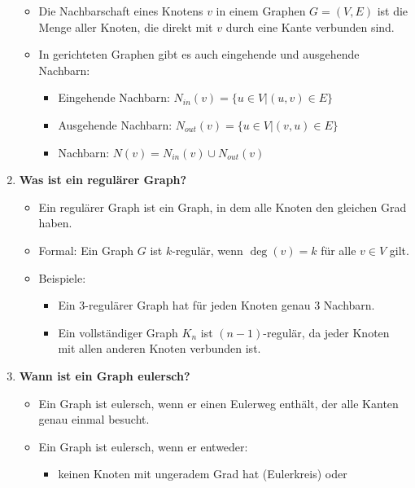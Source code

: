 \documentclass[12pt]{scrartcl}
\begin{document}
\begin{enumerate}
          \begin{itemize}
              \item Die Nachbarschaft eines Knotens $v$ in einem Graphen $G = (V, E)$ ist die Menge aller Knoten, die direkt mit $v$ durch eine Kante verbunden sind.
              \item In gerichteten Graphen gibt es auch eingehende und ausgehende Nachbarn:
                    \begin{itemize}
                        \item Eingehende Nachbarn: $N_{in}(v) = \{u \in V | (u, v) \in E\}$
                        \item Ausgehende Nachbarn: $N_{out}(v) = \{u \in V | (v, u) \in E\}$
                        \item Nachbarn: $N(v) = N_{in}(v) \cup N_{out}(v)$
                    \end{itemize}
          \end{itemize}
    \item \textbf{Was ist ein regulärer Graph?}
          \begin{itemize}
              \item Ein regulärer Graph ist ein Graph, in dem alle Knoten den gleichen Grad haben.
              \item Formal: Ein Graph $G$ ist $k$-regulär, wenn $\deg(v) = k$ für alle $v \in V$ gilt.
              \item Beispiele:
                    \begin{itemize}
                        \item Ein 3-regulärer Graph hat für jeden Knoten genau 3 Nachbarn.
                        \item Ein vollständiger Graph $K_n$ ist $(n-1)$-regulär, da jeder Knoten mit allen anderen Knoten verbunden ist.
                    \end{itemize}
          \end{itemize}
          \pagebreak
    \item \textbf{Wann ist ein Graph eulersch?}
          \begin{itemize}
              \item Ein Graph ist eulersch, wenn er einen Eulerweg enthält, der alle Kanten genau einmal besucht.
              \item Ein Graph ist eulersch, wenn er entweder:
                    \begin{itemize}
                        \item keinen Knoten mit ungeradem Grad hat (Eulerkreis) oder

\end{itemize}
\end{itemize}
\end{enumerate}
\end{document}
